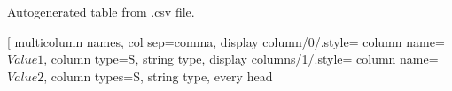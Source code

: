 \documentclass{article}
\begin{document}
	\begin{table}[h!]
		\begin{center}
			\caption{Autogenerated table from .csv file.}
			\label{table1}
			\pgfplotstabletypeset[ 
			multicolumn names, %
			col sep=comma, %
			display column/0/.style={
			column name=$Value 1$, %
			column type={S}, string type}, %
		display columns/1/.style={
		column name=$Value 2$,
	column types={S}, string type},
every head
		\end{center}
	\end{table}
\end{document}
